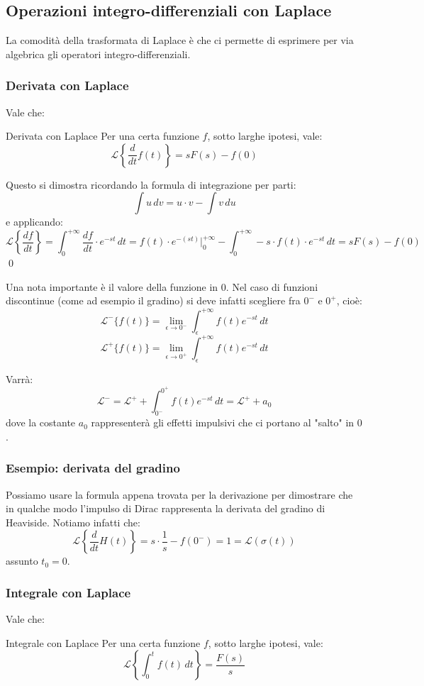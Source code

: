\documentclass[a4paper,11pt]{article}
\begin{document}
\subsection{Operazioni integro-differenziali con Laplace}
La comodità della trasformata di Laplace è che ci permette di esprimere per via algebrica gli operatori integro-differenziali.

\subsubsection{Derivata con Laplace}
Vale che:
\begin{theorem}{Derivata con Laplace}
	Per una certa funzione $f$, sotto larghe ipotesi, vale:
	$$
	\mathcal{L}\left\{ \frac{d}{dt} f(t) \right\} = s F(s) - f(0)
	$$
\end{theorem}

Questo si dimostra ricordando la formula di integrazione per parti:
$$
\int u \, dv = u \cdot v - \int v \, du
$$
e applicando:
$$
\mathcal{L}\left\{ \frac{df}{dt} \right\} = \int_0^{+\infty} \frac{df}{dt} \cdot e^{-st} \, dt = f(t) \cdot e^{-(st)} \Big|_0^{+\infty} - \int_0^{+ \infty} -s \cdot f(t) \cdot e^{-st} \, dt = s F(s) - f(0)
$$ \qed

Una nota importante è il valore della funzione in $0$.
Nel caso di funzioni discontinue (come ad esempio il gradino) si deve infatti scegliere fra $0^-$ e $0^+$, cioè:
$$
\mathcal{L}^{-} \{f(t)\} = \lim_{\epsilon \rightarrow 0^-} \int_\epsilon^{+ \infty} f(t) e^{-st} \, dt
$$
$$
\mathcal{L}^{+} \{f(t)\} = \lim_{\epsilon \rightarrow 0^+} \int_\epsilon^{+ \infty} f(t) e^{-st} \, dt
$$

Varrà:
$$
\mathcal{L}^{-} = \mathcal{L}^{+} + \int_{0^-}^{0^+} f(t) e^{-st} \, dt = \mathcal{L}^{+} + a_0
$$
dove la costante $a_0$ rappresenterà gli effetti impulsivi che ci portano al "salto" in $0$.

\subsubsection{Esempio: derivata del gradino}
Possiamo usare la formula appena trovata per la derivazione per dimostrare che in qualche modo l'impulso di Dirac rappresenta la derivata del gradino di Heaviside.
Notiamo infatti che:
$$
\mathcal{L}\left\{ \frac{d}{dt} H(t) \right\} = s \cdot \frac{1}{s} - f(0^-) = 1 = \mathcal{L}(\sigma(t))
$$
assunto $t_0 = 0$.

\subsubsection{Integrale con Laplace}
Vale che:
\begin{theorem}{Integrale con Laplace}
Per una certa funzione $f$, sotto larghe ipotesi, vale:
$$
\mathcal{L}\left\{ \int_0^t f(t) \, dt \right\} = \frac{F(s)}{s}
$$
\end{theorem}
\end{document}
